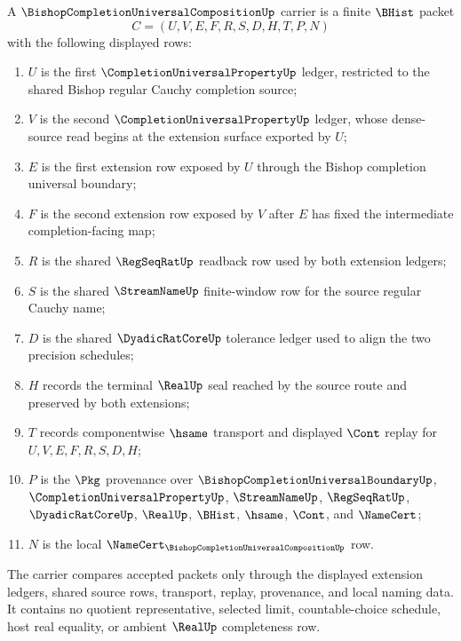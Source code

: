 \begin{definition}
\label{def:bishop-completion-universal-composition-carrier}
A $\BishopCompletionUniversalCompositionUp$ carrier is a finite $\BHist$ packet
$$
C=(U,V,E,F,R,S,D,H,T,P,N)
$$
with the following displayed rows:
\begin{enumerate}
\item $U$ is the first $\CompletionUniversalPropertyUp$ ledger, restricted to the shared Bishop regular Cauchy completion source;
\item $V$ is the second $\CompletionUniversalPropertyUp$ ledger, whose dense-source read begins at the extension surface exported by $U$;
\item $E$ is the first extension row exposed by $U$ through the Bishop completion universal boundary;
\item $F$ is the second extension row exposed by $V$ after $E$ has fixed the intermediate completion-facing map;
\item $R$ is the shared $\RegSeqRatUp$ readback row used by both extension ledgers;
\item $S$ is the shared $\StreamNameUp$ finite-window row for the source regular Cauchy name;
\item $D$ is the shared $\DyadicRatCoreUp$ tolerance ledger used to align the two precision schedules;
\item $H$ records the terminal $\RealUp$ seal reached by the source route and preserved by both extensions;
\item $T$ records componentwise $\hsame$ transport and displayed $\Cont$ replay for $U,V,E,F,R,S,D,H$;
\item $P$ is the $\Pkg$ provenance over $\BishopCompletionUniversalBoundaryUp$, $\CompletionUniversalPropertyUp$, $\StreamNameUp$, $\RegSeqRatUp$, $\DyadicRatCoreUp$, $\RealUp$, $\BHist$, $\hsame$, $\Cont$, and $\NameCert$;
\item $N$ is the local $\NameCert_{\BishopCompletionUniversalCompositionUp}$ row.
\end{enumerate}
The carrier compares accepted packets only through the displayed extension ledgers, shared source rows, transport, replay, provenance, and local naming data. It contains no quotient representative, selected limit, countable-choice schedule, host real equality, or ambient $\RealUp$ completeness row.
\end{definition}

